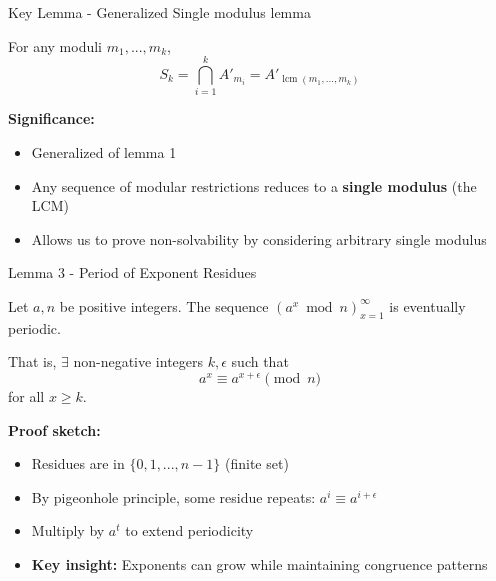 \begin{frame}{Key Lemma - Generalized Single modulus lemma}
    \begin{lemmas}
        For any moduli $m_1,...,m_k$,
        \[S_k = \bigcap_{i=1}^k A'_{m_i} = A'_{\operatorname{lcm}(m_1,...,m_k)}\]
    \end{lemmas}
    
    \textbf{Significance:}
    \begin{itemize}
    \item  Generalized of lemma 1
        \item Any sequence of modular restrictions reduces to a \textbf{single modulus} (the LCM)
        \item Allows us to prove non-solvability by considering arbitrary single modulus
    \end{itemize}
\end{frame}
\begin{frame}{Lemma 3 - Period of Exponent Residues}
    \begin{lemmas}
        Let $a,n$ be positive integers. The sequence $(a^x \bmod n)_{x=1}^\infty$ is eventually periodic.
        
        That is, $\exists$ non-negative integers $k,\epsilon$ such that
        \[a^x \equiv a^{x+\epsilon} \pmod n\]
        for all $x \geq k$.
    \end{lemmas}
    
    \textbf{Proof sketch:}
    \begin{itemize}
        \item Residues are in $\{0,1,...,n-1\}$ (finite set)
        \item By pigeonhole principle, some residue repeats: $a^i \equiv a^{i+\epsilon}$
        \item Multiply by $a^t$ to extend periodicity
        \item  \textbf{Key insight:} Exponents can grow while maintaining congruence patterns
    \end{itemize}
    
    
\end{frame}

